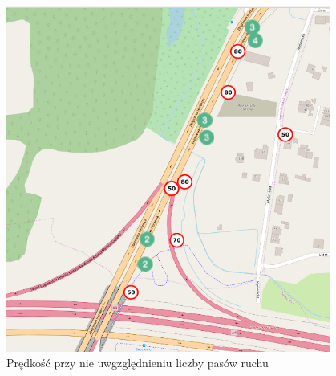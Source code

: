 \begin{figure}[h]
\caption{Prędkość przy nie uwgzględnieniu liczby pasów ruchu}
\label{sec:laneNumber}
\centering
\includegraphics[width=0.95\textwidth]{laneNumber}
\end{figure}

